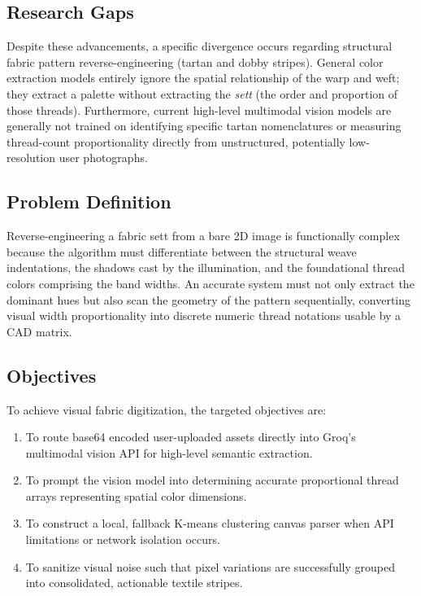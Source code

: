 \subsection{Research Gaps}
Despite these advancements, a specific divergence occurs regarding structural fabric pattern reverse-engineering (tartan and dobby stripes). General color extraction models entirely ignore the spatial relationship of the warp and weft; they extract a palette without extracting the \textit{sett} (the order and proportion of those threads). Furthermore, current high-level multimodal vision models are generally not trained on identifying specific tartan nomenclatures or measuring thread-count proportionality directly from unstructured, potentially low-resolution user photographs.

\subsection{Problem Definition}
Reverse-engineering a fabric sett from a bare 2D image is functionally complex because the algorithm must differentiate between the structural weave indentations, the shadows cast by the illumination, and the foundational thread colors comprising the band widths. An accurate system must not only extract the dominant hues but also scan the geometry of the pattern sequentially, converting visual width proportionality into discrete numeric thread notations usable by a CAD matrix.

\subsection{Objectives}
To achieve visual fabric digitization, the targeted objectives are:
\begin{enumerate}
    \item To route base64 encoded user-uploaded assets directly into Groq's multimodal vision API for high-level semantic extraction.
    \item To prompt the vision model into determining accurate proportional thread arrays representing spatial color dimensions.
    \item To construct a local, fallback K-means clustering canvas parser when API limitations or network isolation occurs.
    \item To sanitize visual noise such that pixel variations are successfully grouped into consolidated, actionable textile stripes.
\end{enumerate}

